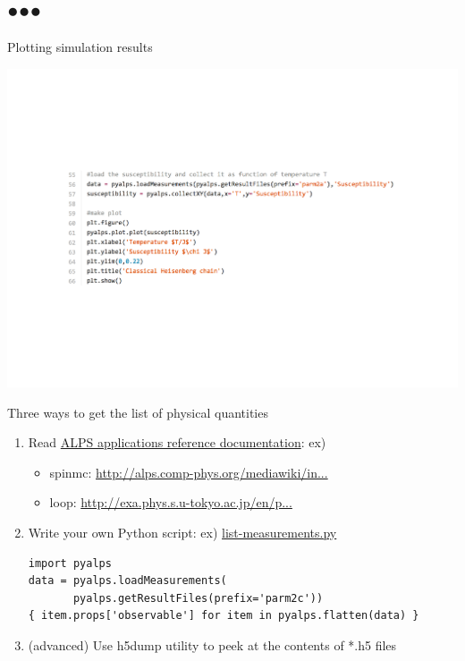\subsection*{{\protect\color{red}●}{\protect\color{blue}●}{\protect\color{green}●}}

\begin{frame}[t,fragile]{Plotting simulation results}
    \begin{center}
      \includegraphics[height=.5\textheight]{tutorial2a-3.pdf}
    \end{center}
\end{frame}

\begin{frame}[t,fragile]{Three ways to get the list of physical quantities}
  \begin{enumerate}
    \setlength{\itemsep}{1em}
  \item Read \href{http://alps.comp-phys.org/mediawiki/index.php/ALPS_2_Documentation:Overview}{ALPS applications reference documentation}: ex)
    \begin{itemize}
    \item spinmc: {\footnotesize \href{http://alps.comp-phys.org/mediawiki/index.php/Documentation:ClassicalMCSimulations}{http://alps.comp-phys.org/mediawiki/in...}}
    \item loop: {\footnotesize \href{http://exa.phys.s.u-tokyo.ac.jp/en/projects/alps-looper}{http://exa.phys.s.u-tokyo.ac.jp/en/p...}}
    \end{itemize}
  \item Write your own Python script: ex) \href{https://gist.github.com/wistaria/71cb8d7a22f45bfe256d}{list-measurements.py}
\begin{lstlisting}
import pyalps
data = pyalps.loadMeasurements(
       pyalps.getResultFiles(prefix='parm2c'))
{ item.props['observable'] for item in pyalps.flatten(data) }
\end{lstlisting}
  \item (advanced) Use h5dump utility to peek at the contents of *.h5 files
  \end{enumerate}
\end{frame}

